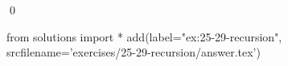 
\begin{ex}
  \label{ex:25-29-recursion}
  
  \qed
\end{ex}
\begin{python0}
from solutions import *
add(label="ex:25-29-recursion",
    srcfilename='exercises/25-29-recursion/answer.tex')
\end{python0}
